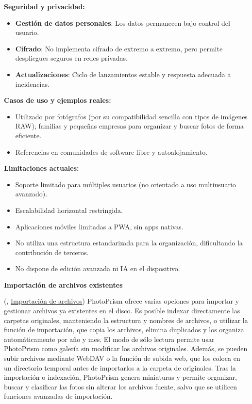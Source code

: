 \textbf{Seguridad y privacidad:}
\begin{itemize}
    \item \textbf{Gestión de datos personales}: Los datos permanecen bajo control del usuario.
    \item \textbf{Cifrado}: No implementa cifrado de extremo a extremo, pero permite despliegues seguros en redes privadas.
    \item \textbf{Actualizaciones}: Ciclo de lanzamientos estable y respuesta adecuada a incidencias.
\end{itemize}

\textbf{Casos de uso y ejemplos reales:}
\begin{itemize}
    \item Utilizado por fotógrafos (por su compatibilidad sencilla con tipos de imágenes RAW), familias y pequeñas empresas para organizar y buscar fotos de forma eficiente.
    \item Referencias en comunidades de software libre y autoalojamiento.
\end{itemize}

\textbf{Limitaciones actuales:}
\begin{itemize}
    \item Soporte limitado para múltiples usuarios (no orientado a uso multiusuario avanzado).
    \item Escalabilidad horizontal restringida.
    \item Aplicaciones móviles limitadas a PWA, sin apps nativas.
    \item No utiliza una estructura estandarizada para la organización, dificultando la contribución de terceros.
    \item No dispone de edición avanzada ni IA en el dispositivo.
\end{itemize}

\textbf{Importación de archivos existentes}

(\cite{photoprism-documentation}, \href{https://docs.photoprism.app/developer-guide/media/import/}{Importación de archivos}) PhotoPrism ofrece varias opciones para importar y gestionar archivos ya existentes en el disco. Es posible indexar directamente las carpetas originales, manteniendo la estructura y nombres de archivos, o utilizar la función de importación, que copia los archivos, elimina duplicados y los organiza automáticamente por año y mes. El modo de sólo lectura permite usar PhotoPrism como galería sin modificar los archivos originales. Además, se pueden subir archivos mediante WebDAV o la función de subida web, que los coloca en un directorio temporal antes de importarlos a la carpeta de originales. Tras la importación o indexación, PhotoPrism genera miniaturas y permite organizar, buscar y clasificar las fotos sin alterar los archivos fuente, salvo que se utilicen funciones avanzadas de importación.

